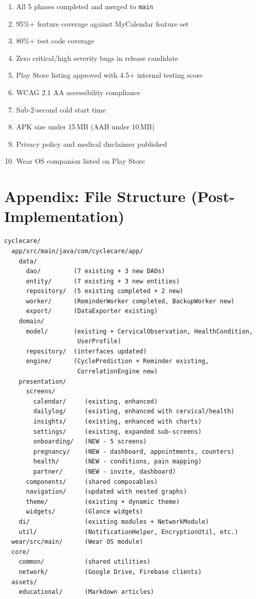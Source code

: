 \documentclass[12pt,a4paper]{article}
\begin{document}
\begin{tcolorbox}[colback=primary!5, colframe=primary, title=\textbf{Definition of Done — Feature Parity}]
\begin{enumerate}[leftmargin=1.5em]
  \item All 5 phases completed and merged to \texttt{main}
  \item 95\%+ feature coverage against MyCalendar feature set
  \item 80\%+ test code coverage
  \item Zero critical/high severity bugs in release candidate
  \item Play Store listing approved with 4.5+ internal testing score
  \item WCAG 2.1 AA accessibility compliance
  \item Sub-2-second cold start time
  \item APK size under 15\,MB (AAB under 10\,MB)
  \item Privacy policy and medical disclaimer published
  \item Wear OS companion listed on Play Store
\end{enumerate}
\end{tcolorbox}

\section{Appendix: File Structure (Post-Implementation)}

\begin{lstlisting}
cyclecare/
  app/src/main/java/com/cyclecare/app/
    data/
      dao/         (7 existing + 3 new DAOs)
      entity/      (7 existing + 3 new entities)
      repository/  (5 existing completed + 2 new)
      worker/      (ReminderWorker completed, BackupWorker new)
      export/      (DataExporter existing)
    domain/
      model/       (existing + CervicalObservation, HealthCondition,
                    UserProfile)
      repository/  (interfaces updated)
      engine/      (CyclePrediction + Reminder existing,
                    CorrelationEngine new)
    presentation/
      screens/
        calendar/     (existing, enhanced)
        dailylog/     (existing, enhanced with cervical/health)
        insights/     (existing, enhanced with charts)
        settings/     (existing, expanded sub-screens)
        onboarding/   (NEW - 5 screens)
        pregnancy/    (NEW - dashboard, appointments, counters)
        health/       (NEW - conditions, pain mapping)
        partner/      (NEW - invite, dashboard)
      components/     (shared composables)
      navigation/     (updated with nested graphs)
      theme/          (existing + dynamic theme)
      widgets/        (Glance widgets)
    di/               (existing modules + NetworkModule)
    util/             (NotificationHelper, EncryptionUtil, etc.)
  wear/src/main/      (Wear OS module)
  core/
    common/           (shared utilities)
    network/          (Google Drive, Firebase clients)
  assets/
    educational/      (Markdown articles)
\end{lstlisting}
\end{document}
